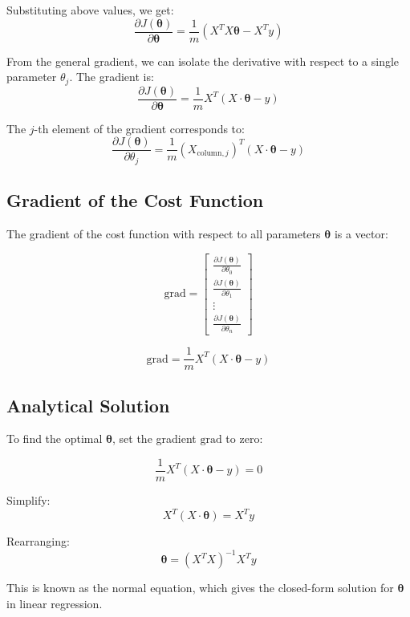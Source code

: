 Substituting above values, we get:
\begin{equation}
\frac{\partial J(\boldsymbol{\theta})}{\partial \boldsymbol{\theta}} = \frac{1}{m} \left( X^T X \boldsymbol{\theta} - X^T y \right)
\end{equation}


From the general gradient, we can isolate the derivative with respect to a single parameter \( \theta_j \). The gradient is:
\[
\frac{\partial J(\boldsymbol{\theta})}{\partial \boldsymbol{\theta}} = \frac{1}{m} X^T (X \cdot \boldsymbol{\theta} - y)
\]

The \( j \)-th element of the gradient corresponds to:
\[
\frac{\partial J(\boldsymbol{\theta})}{\partial \theta_j} = \frac{1}{m} (X_{\text{column}, j})^T (X \cdot \boldsymbol{\theta} - y)
\]

\subsection{Gradient of the Cost Function}

The gradient of the cost function with respect to all parameters \(\boldsymbol{\theta}\) is a vector:

\begin{equation}
    \text{grad} = \begin{bmatrix}
\frac{\partial J(\boldsymbol{\theta})}{\partial \theta_0} \\
\frac{\partial J(\boldsymbol{\theta})}{\partial \theta_1} \\
\vdots \\
\frac{\partial J(\boldsymbol{\theta})}{\partial \theta_n}
\end{bmatrix}
\end{equation}

\begin{equation}
    \text{grad} = \frac{1}{m} X^T (X \cdot \boldsymbol{\theta} - y)
\end{equation}

\subsection{Analytical Solution}

To find the optimal \(\boldsymbol{\theta}\), set the gradient \(\text{grad}\) to zero:

\[
\frac{1}{m} X^T (X \cdot \boldsymbol{\theta} - y) = 0
\]

Simplify:
\[
X^T (X \cdot \boldsymbol{\theta}) = X^T y
\]

Rearranging:
\begin{equation}
\boldsymbol{\theta} = (X^T X)^{-1} X^T y
\end{equation}

This is known as the normal equation, which gives the closed-form solution for \(\boldsymbol{\theta}\) in
linear regression.